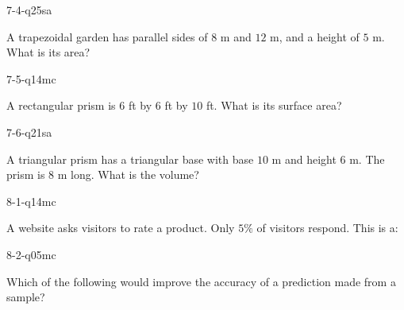 \begin{practiceQuestion}{7-4-q25}{sa}
\begin{questionText}
A trapezoidal garden has parallel sides of $8$ m and $12$ m, and a height of $5$ m. What is its area?
\end{questionText}
\end{practiceQuestion}

\begin{practiceQuestion}{7-5-q14}{mc}
\begin{questionText}
A rectangular prism is $6$ ft by $6$ ft by $10$ ft. What is its surface area?
\end{questionText}
\end{practiceQuestion}

\begin{practiceQuestion}{7-6-q21}{sa}
\begin{questionText}
A triangular prism has a triangular base with base $10$ m and height $6$ m. The prism is $8$ m long. What is the volume?
\end{questionText}
\end{practiceQuestion}

\begin{practiceQuestion}{8-1-q14}{mc}
\begin{questionText}
A website asks visitors to rate a product. Only $5\%$ of visitors respond. This is a:
\end{questionText}
\end{practiceQuestion}

\begin{practiceQuestion}{8-2-q05}{mc}
\begin{questionText}
Which of the following would improve the accuracy of a prediction made from a sample?
\end{questionText}
\end{practiceQuestion}

